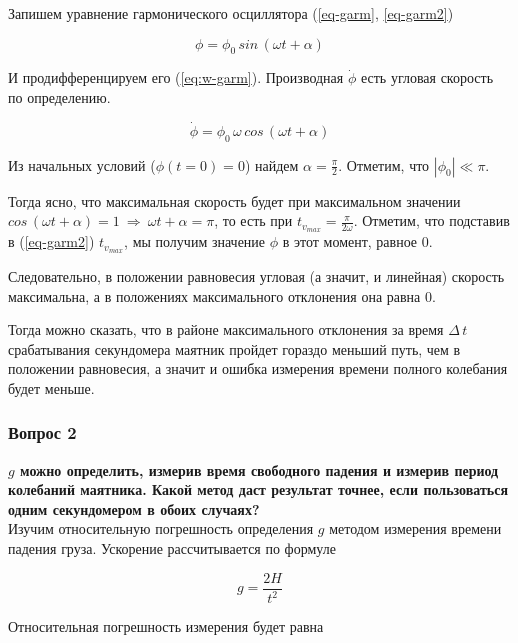 \documentclass[a4paper,12pt]{article}
\begin{document}
		Запишем уравнение гармонического осциллятора (\ref{eq-garm}, \ref{eq-garm2})

		\begin{equation}
			\label{eq-garm2}
			\phi=\phi_0\,sin\,(\omega{}t+\alpha)
		\end{equation}

		И продифференцируем его (\ref{eq:w-garm}). Производная $\dot{\phi}$ есть угловая скорость по определению.

		\begin{equation}
			\label{eq:w-garm}
			\dot{\phi}=\phi_0\,\omega\,cos\,(\omega{}t+\alpha)
		\end{equation}

		Из начальных условий ($\phi(t=0)=0$) найдем $\alpha=\frac{\pi}{2}$. Отметим, что $|\phi_0|\ll\pi$. 

		Тогда ясно, что максимальная скорость будет при максимальном значении $cos\,(\omega{}t+\alpha)=1\ \Longrightarrow\ \omega{}t+\alpha=\pi$, то есть при $t_{v_{max}}=\frac{\pi}{2\omega}$. Отметим, что подставив в (\ref{eq-garm2}) $t_{v_{max}}$, мы получим значение $\phi$ в этот момент, равное 0. 

		Следовательно, в положении равновесия угловая (а значит, и линейная) скорость максимальна, а в положениях максимального отклонения она равна 0.

		Тогда можно сказать, что в районе максимального отклонения за время $\Delta\,t$ срабатывания секундомера маятник пройдет гораздо меньший путь, чем в положении равновесия, а значит и ошибка измерения времени полного колебания будет меньше.


\subsubsection{Вопрос 2}

\textbf{$g$ можно определить, измерив время свободного падения и измерив период колебаний маятника. Какой метод даст результат точнее, если пользоваться одним секундомером в обоих случаях?}
\\

		Изучим относительную погрешность определения ${g}$ методом измерения времени падения груза. Ускорение рассчитывается по формуле 

		\begin{equation}
			g=\frac{2H}{t^2}
		\end{equation}

		Относительная погрешность измерения будет равна
\end{document}
